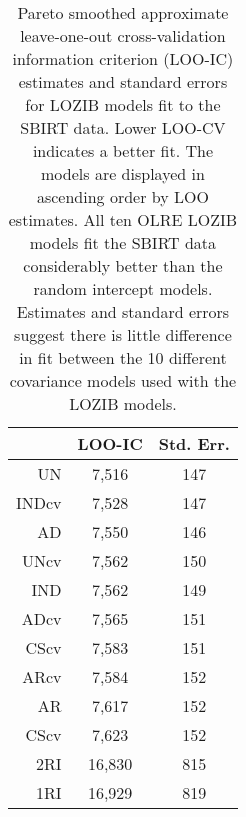 \documentclass[12pt]{article}
\begin{document}
\begin{table}[ht]
	\centering
	\begin{tabular}{rcc}
		\hline
		& LOO-IC & Std. Err.\\ 
		\hline
		 UN & 7,516 & 147\\ 
		 INDcv& 7,528 & 147\\
		 AD & 7,550 & 146\\
		 UNcv & 7,562 & 150\\
		  IND & 7,562 & 149 \\
		 ADcv& 7,565 & 151\\
		 CScv & 7,583 & 151\\
		 ARcv& 7,584 & 152\\
		 AR& 7,617 & 152\\
		 CScv & 7,623 & 152\\
		 2RI& 16,830 & 815\\
		 1RI&16,929 & 819 \\
		 \hline
	\end{tabular}
	\caption{Pareto smoothed approximate leave-one-out cross-validation information criterion (LOO-IC) estimates and standard errors for LOZIB models fit to the SBIRT data. Lower LOO-CV indicates a better fit. The models are displayed in ascending order by LOO estimates. All ten OLRE LOZIB models fit the SBIRT data considerably better than the random intercept models. Estimates and standard errors suggest there is little difference in fit between the 10 different covariance models used with the LOZIB models.}
	\label{tab:loo}
\end{table}
\end{document}
